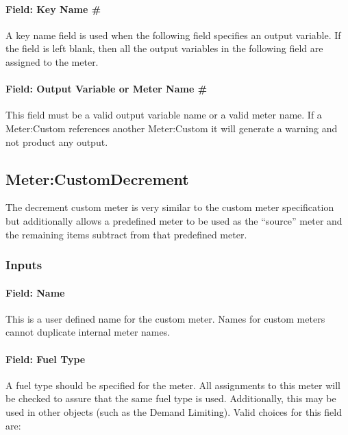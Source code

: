 \paragraph{Field: Key Name \#}\label{field-key-name}

A key name field is used when the following field specifies an output variable. If the field is left blank, then all the output variables in the following field are assigned to the meter.

\paragraph{Field: Output Variable or Meter Name \#}\label{field-output-variable-or-meter-name}

This field must be a valid output variable name or a valid meter name. If a Meter:Custom references another Meter:Custom it will generate a warning and not product any output.

\subsection{Meter:CustomDecrement}\label{metercustomdecrement}

The decrement custom meter is very similar to the custom meter specification but additionally allows a predefined meter to be used as the ``source'' meter and the remaining items subtract from that predefined meter.

\subsubsection{Inputs}\label{inputs-18-008}

\paragraph{Field: Name}\label{field-name-1-040}

This is a user defined name for the custom meter. Names for custom meters cannot duplicate internal meter names.

\paragraph{Field: Fuel Type}\label{field-fuel-type-1-003}

A fuel type should be specified for the meter. All assignments to this meter will be checked to assure that the same fuel type is used. Additionally, this may be used in other objects (such as the Demand Limiting). Valid choices for this field are:

